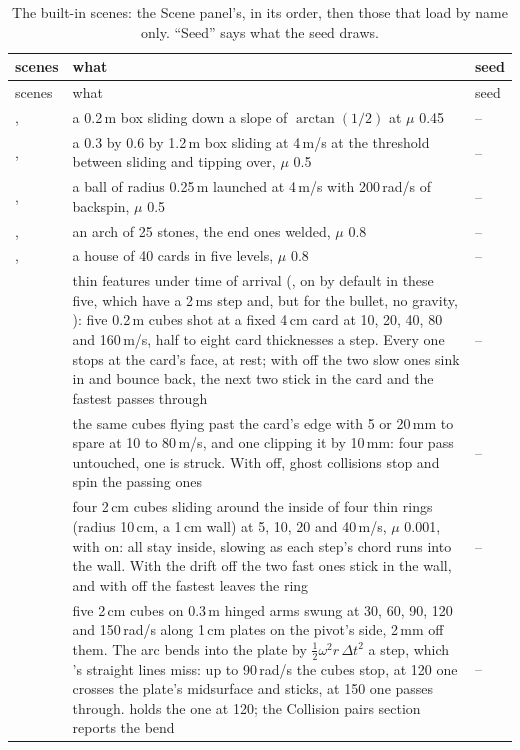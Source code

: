 \begingroup\small
\begin{longtable}{@{}L{44mm}L{92mm}L{17mm}@{}}
\caption{The built-in scenes: the Scene panel's, in its order, then those that load by name only. ``Seed'' says what the seed draws.}\label{tab:scenes}\\
\toprule
scenes & what & seed \\
\midrule
\endfirsthead
\toprule
scenes & what & seed \\
\midrule
\endhead
{},  & a 0.2\,m box sliding down a slope of $\arctan(1/2)$ at $\mu$ 0.45 & -- \\
,  & a 0.3 by 0.6 by 1.2\,m box sliding at 4\,m/s at the threshold between sliding and tipping over, $\mu$ 0.5 & -- \\
,  & a ball of radius 0.25\,m launched at 4\,m/s with 200\,rad/s of backspin, $\mu$ 0.5 & -- \\
,  & an arch of 25 stones, the end ones welded, $\mu$ 0.8 & -- \\
,  & a house of 40 cards in five levels, $\mu$ 0.8 & -- \\
 & thin features under time of arrival (, on by default in these five, which have a 2\,ms step and, but for the bullet, no gravity, ): five 0.2\,m cubes shot at a fixed 4\,cm card at 10, 20, 40, 80 and 160\,m/s, half to eight card thicknesses a step. Every one stops at the card's face, at rest; with  off the two slow ones sink in and bounce back, the next two stick in the card and the fastest passes through & -- \\
 & the same cubes flying past the card's edge with 5 or 20\,mm to spare at 10 to 80\,m/s, and one clipping it by 10\,mm: four pass untouched, one is struck. With  off, ghost collisions stop and spin the passing ones & -- \\
 & four 2\,cm cubes sliding around the inside of four thin rings (radius 10\,cm, a 1\,cm wall) at 5, 10, 20 and 40\,m/s, $\mu$ 0.001, with  on: all stay inside, slowing as each step's chord runs into the wall. With the drift off the two fast ones stick in the wall, and with  off the fastest leaves the ring & -- \\
 & five 2\,cm cubes on 0.3\,m hinged arms swung at 30, 60, 90, 120 and 150\,rad/s along 1\,cm plates on the pivot's side, 2\,mm off them. The arc bends into the plate by $\frac12\omega^2 r\,\Delta t^2$ a step, which 's straight lines miss: up to 90\,rad/s the cubes stop, at 120 one crosses the plate's midsurface and sticks, at 150 one passes through.  holds the one at 120; the Collision pairs section reports the bend & -- \\

\end{longtable}

